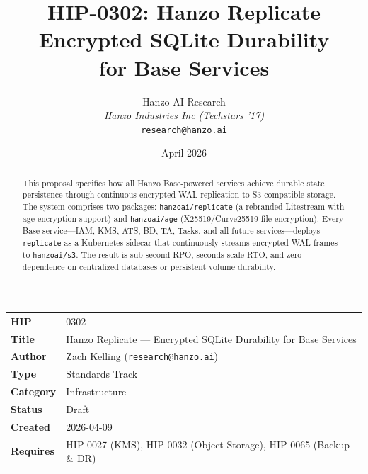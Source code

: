 \documentclass[11pt]{article}
\title{HIP-0302: Hanzo Replicate\\[0.3em]
{\large Encrypted SQLite Durability\\for Base Services}}
\author{
    Hanzo AI Research \\
    \textit{Hanzo Industries Inc (Techstars '17)} \\
    \texttt{research@hanzo.ai}
}
\date{April 2026}
\begin{document}
\hanzocoverpage

\noindent
\begin{tabular}{@{}ll}
\textbf{HIP}      & 0302 \\
\textbf{Title}    & Hanzo Replicate --- Encrypted SQLite Durability for Base Services \\
\textbf{Author}   & Zach Kelling (\texttt{research@hanzo.ai}) \\
\textbf{Type}     & Standards Track \\
\textbf{Category} & Infrastructure \\
\textbf{Status}   & Draft \\
\textbf{Created}  & 2026-04-09 \\
\textbf{Requires} & HIP-0027 (KMS), HIP-0032 (Object Storage), HIP-0065 (Backup \& DR) \\
\end{tabular}

\vspace{1em}

\begin{abstract}
This proposal specifies how all Hanzo Base-powered services achieve durable
state persistence through continuous encrypted WAL replication to
S3-compatible storage. The system comprises two packages:
\texttt{hanzoai/replicate} (a rebranded Litestream with age encryption
support) and \texttt{hanzoai/age} (X25519/Curve25519 file encryption). Every
Base service---IAM, KMS, ATS, BD, TA, Tasks, and all future
services---deploys \texttt{replicate} as a Kubernetes sidecar that
continuously streams encrypted WAL frames to \texttt{hanzoai/s3}. The result
is sub-second RPO, seconds-scale RTO, and zero dependence on centralized
databases or persistent volume durability.
\end{abstract}














\end{document}
